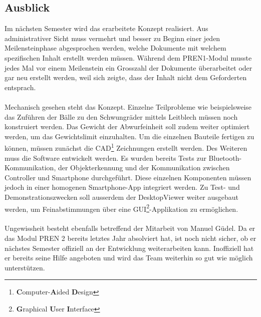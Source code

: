 \subsection{Ausblick}
Im nächsten Semester wird das erarbeitete Konzept realisiert. Aus administrativer 
Sicht muss vermehrt und besser zu Beginn einer jeden Meilensteinphase abgesprochen 
werden, welche Dokumente mit welchem spezifischen Inhalt erstellt werden müssen. 
Während dem PREN1-Modul musste jedes Mal vor einem Meilenstein ein Grosszahl der 
Dokumente überarbeitet oder gar neu erstellt werden, weil sich zeigte, dass der 
Inhalt nicht dem Geforderten entsprach.\\
\\
Mechanisch gesehen steht das Konzept. Einzelne Teilprobleme wie beispielsweise 
das Zuführen der Bälle zu den Schwungräder mittels Leitblech müssen noch konstruiert 
werden. Das Gewicht der Abwurfeinheit soll zudem weiter optimiert werden, um das 
Gewichtslimit einzuhalten. Um die einzelnen Bauteile fertigen zu können, müssen 
zunächst die CAD\footnote{\textbf{C}omputer-\textbf{A}ided \textbf{D}esign} 
Zeichnungen erstellt werden. Des Weiteren muss die Software 
entwickelt werden. Es wurden bereits Tests zur Bluetooth-Kommunikation, der 
Objekterkennung und der Kommunikation zwischen Controller und Smartphone 
durchgeführt. Diese einzelnen Komponenten müssen jedoch in einer homogenen 
Smartphone-App integriert werden. Zu Test- und Demonstrationszwecken soll ausserdem 
der DesktopViewer weiter ausgebaut werden, um Feinabstimmungen über eine 
GUI\footnote{\textbf{G}raphical  \textbf{U}ser \textbf{I}nterface}-Applikation zu 
ermöglichen.\\
\\
Ungewissheit besteht ebenfalls betreffend der Mitarbeit von Manuel Güdel. Da er 
das Modul PREN 2 bereits letztes Jahr absolviert hat, ist noch nicht sicher, ob 
er nächstes Semester offiziell an der Entwicklung weiterarbeiten kann. Inoffiziell 
hat er bereits seine Hilfe angeboten und wird das Team weiterhin so gut wie möglich 
unterstützen.
